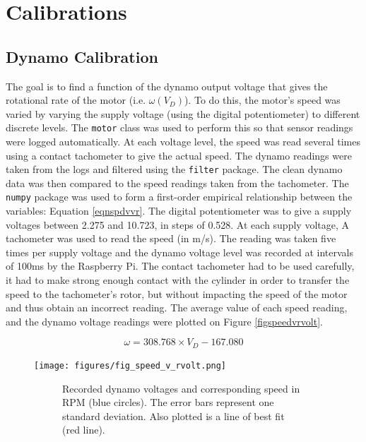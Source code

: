 \documentclass[twoside,a4]{report}
\def\br{\newline \newline \noindent}
\begin{document}
	\section{Calibrations}
	
	\subsection*{Dynamo Calibration}
	The goal is to find a function of the dynamo output voltage that gives the rotational rate of the motor (i.e. \(\omega ({V_D})\)). To do this, the motor's speed was varied by varying the supply voltage (using the digital potentiometer) to different discrete levels. The \texttt{motor} class was used to perform this so that sensor readings were logged automatically. At each voltage level, the speed was read several times using a contact tachometer to give the actual speed. The dynamo readings were taken from the logs and filtered using the \texttt{filter} package. The clean dynamo data was then compared to the speed readings taken from the tachometer. The \texttt{numpy} package was used to form a first-order empirical relationship between the variables: Equation \ref{eqnspdvvr}. 
	\br
	The digital potentiometer was to give a supply voltages between 2.275 and 10.723, in steps of 0.528. At each supply voltage, A tachometer was used to read the speed (in m/s). The reading was taken five times per supply voltage and the dynamo voltage level was recorded at intervals of 100ms by the Raspberry Pi. The contact tachometer had to be used carefully, it had to make strong enough contact with the cylinder in order to transfer the speed to the tachometer's rotor, but without impacting the speed of the motor and thus obtain an incorrect reading. The average value of each speed reading, and the dynamo voltage readings were plotted on Figure \ref{figspeedvrvolt}.
	
	\begin{equation}
	\omega = 308.768 \times {V_D} - 167.080
	\label{eqnspdvvr}
	\end{equation}
	
	
	\begin{figure}[!htb]
		\centering
		\texttt{[image: figures/fig\_speed\_v\_rvolt.png]}
		\caption{Dynamo Calibration Results}
		\label{figspeedvrvolt}
		\begin{subfigure}{0.9\textwidth}
			\footnotesize Recorded dynamo voltages and corresponding speed in RPM (blue circles). The error bars represent one standard deviation. Also plotted is a line of best fit (red line).
		\end{subfigure}
	\end{figure}
	
\end{document}
